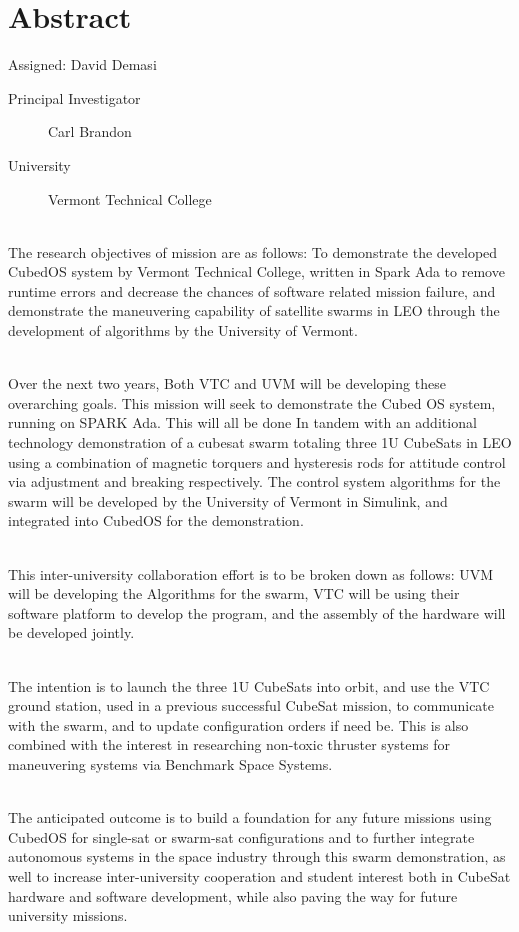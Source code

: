 \section{Abstract}
Assigned: David Demasi \cite{brandon:2008}

\begin{description}
\item[Principal Investigator] Carl Brandon
\item[University] Vermont Technical College
\end{description}

\\The research objectives of mission are as follows:  To demonstrate the developed CubedOS system by Vermont Technical College, written in Spark Ada to remove runtime errors and decrease the chances of software related mission failure, and demonstrate the maneuvering capability of satellite swarms in LEO through the development of algorithms by the University of Vermont.

\\Over the next two years, Both VTC and UVM will be developing these overarching goals. This mission will seek to demonstrate the Cubed OS system, running on SPARK Ada. This will all be done In tandem with an additional technology demonstration of a cubesat swarm totaling three 1U CubeSats in LEO using a combination of magnetic torquers and hysteresis rods for attitude control via adjustment and breaking respectively. The control system algorithms for the swarm will be developed by the University of Vermont in Simulink, and integrated into CubedOS for the demonstration. 

\\This inter-university collaboration effort is to be broken down as follows: UVM will be developing the Algorithms for the swarm, VTC will be using their software platform to develop the program, and the assembly of the hardware will be developed jointly.

\\The intention is to launch the three 1U CubeSats into orbit, and use the VTC ground station, used in a previous successful CubeSat mission, to communicate with the swarm, and to update configuration orders if need be. This is also combined with the interest in researching non-toxic thruster systems for maneuvering systems via Benchmark Space Systems.
	
\\The anticipated outcome is to build a foundation for any future missions using CubedOS for single-sat or swarm-sat configurations and to further integrate autonomous systems in the space industry through this swarm demonstration, as well to increase inter-university cooperation and student interest both in CubeSat hardware and software development, while also paving the way for future university missions.
	
